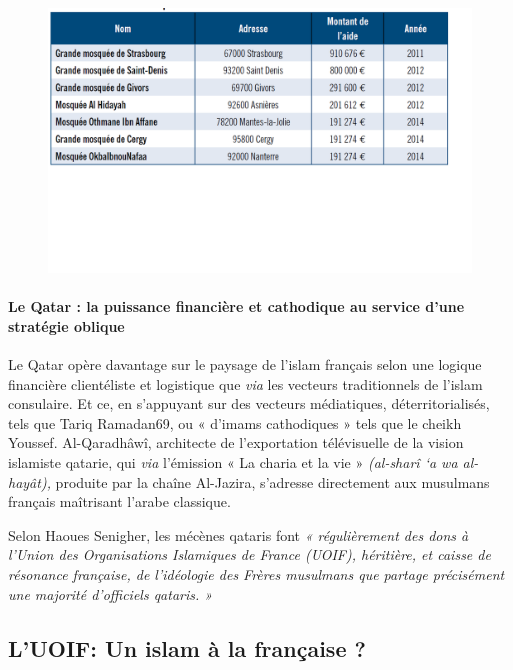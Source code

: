 \begin{figure}
    \centering
    \includegraphics[width=\textwidth]{ImageIslamFrance/MosqueeArabieSaoudite.png}

    \label{fig:MosqueeArabieSaoudite}
\end{figure}

\paragraph{Le Qatar : la puissance financière et cathodique au service
d'une stratégie oblique}

Le Qatar opère davantage sur le paysage de l'islam français selon une
logique financière clientéliste et logistique que \emph{via} les
vecteurs traditionnels de l'islam consulaire. Et ce, en s'appuyant sur
des vecteurs médiatiques, déterritorialisés, tels que Tariq Ramadan69,
ou « d'imams cathodiques » tels que le cheikh Youssef. Al-Qaradhâwî,
architecte de l'exportation télévisuelle de la vision islamiste qatarie,
qui \emph{via} l'émission « La charia et la vie » \emph{(al-sharî `a wa
al-hayât),} produite par la chaîne Al-Jazira, s'adresse directement aux
musulmans français maîtrisant l'arabe classique.

Selon Haoues Senigher, les mécènes qataris font \emph{« régulièrement
des dons à l'Union des Organisations Islamiques de France (UOIF),
héritière, et caisse de résonance française, de l'idéologie des Frères
musulmans que partage précisément une majorité d'officiels qataris. »}

\subsection{L'UOIF: Un islam à la française ?}

